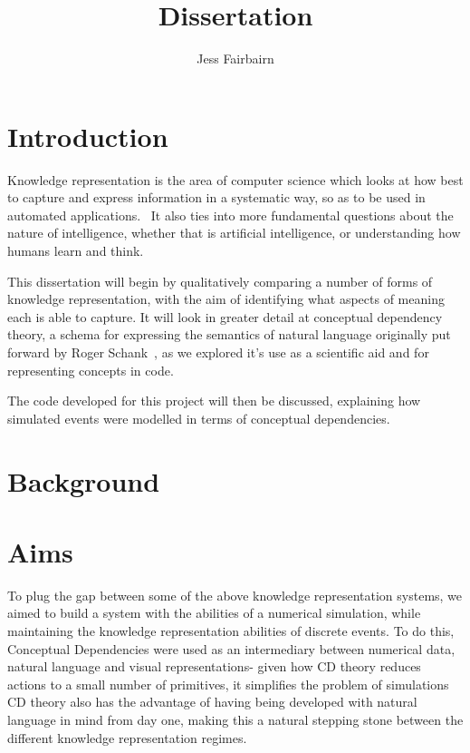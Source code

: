 \documentclass{article}
\author{Jess Fairbairn}
\title{Dissertation}
\begin{document}
    \maketitle
    \tableofcontents
    \section{Introduction}
    Knowledge representation is the area of computer science which looks at how best to capture and express information in a systematic way, so as to be used in automated applications.~\cite{brachman1992knowledge} It also ties into more fundamental questions about the nature of intelligence, whether that is artificial intelligence, or understanding how humans learn and think.

    This dissertation will begin by qualitatively comparing a number of forms of knowledge representation, with the aim of identifying what aspects of meaning each is able to capture. It will look in greater detail at conceptual dependency theory, a schema for expressing the semantics of natural language originally put forward by Roger Schank~\cite{SCHANK1972552}, as we explored it's use as a scientific aid and for representing concepts in code.

    The code developed for this project will then be discussed, explaining how simulated events were modelled in terms of conceptual dependencies. 

    \section{Background}
    

    \section{Aims}
    To plug the gap between some of the above knowledge representation systems, we aimed to build a system with the abilities of a numerical simulation, while maintaining the knowledge representation abilities of discrete events. To do this, Conceptual Dependencies were used as an intermediary between numerical data, natural language and visual representations- given how CD theory reduces actions to a small number of primitives, it simplifies the problem of simulations CD theory also has the advantage of having being developed with natural language in mind from day one, making this a natural stepping stone between the different knowledge representation regimes.
\end{document}
